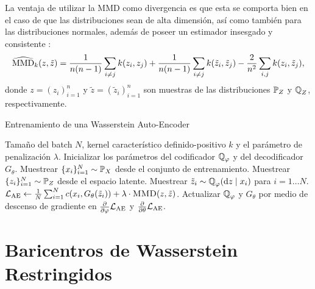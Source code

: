 La ventaja de utilizar la MMD como divergencia es que esta se comporta bien en el caso de que las distribuciones sean de alta dimensión, así como también para las distribuciones normales, además de poseer un estimador insesgado y consistente \cite{gretton2012kernel}:
\begin{equation}
    \widehat {\operatorname{MMD}}_k(z, \tilde z)
    = \frac{1}{n(n-1)} \sum_{i\neq j} k(z_i, z_j)
    + \frac{1}{n(n-1)} \sum_{i\neq j} k(\tilde z_i, \tilde z_j)
    - \frac{2}{n^2} \sum_{i, j} k(z_i, \tilde z_j),
\end{equation}
donde $z = (z_i)_{i=1}^{n}$ y $\tilde z = (\tilde z_i)_{i=1}^{n}$ son muestras de las distribuciones $\Prob_Z$ y $\ProbQ_Z$, respectivamente.

\begin{algorithm}[H]
    \caption{Entrenamiento de una Wasserstein Auto-Encoder \cite{tolstikhin2017wasserstein}}\label{alg:WAE}
    \begin{algorithmic}[1]
        \Require Tamaño del batch $N$, kernel característico definido-positivo $k$ y el parámetro de penalización $\lambda$.
        \State{}
        \EndFunction
        \State Inicializar los parámetros del codificador $\ProbQ_\varphi$ y del decodificador $G_\theta$.
        \State Muestrear $\{x_i\}_{i=1}^{N} \sim \Prob_X$ desde el conjunto de entrenamiento.
        \State Muestrear $\{z_i\}_{i=1}^{N} \sim \Prob_Z$ desde el espacio latente.
        \State Muestrear $\tilde z_i \sim \ProbQ_\varphi(\dd z \mid x_i)$ para $i=1\dots N$.
        \State $\cL_{\mathrm{AE}} \gets \frac{1}{N}\sum_{i=1}^{N} c(x_i, G_\theta(\tilde z_i)) + \lambda \cdot \Call{MMD}{z, \tilde z}$.
        \State Actualizar $\ProbQ_\varphi$ y $G_\theta$ por medio de descenso de gradiente en $\pdv{\varphi} \cL_{\mathrm{AE}}$ y $\pdv{\theta} \mathcal{L}_{\mathrm{AE}}$.
        \EndWhile
    \end{algorithmic}
\end{algorithm}


\section{Baricentros de Wasserstein Restringidos}\label{sec:app-bar-wass-Proyectados}  %

